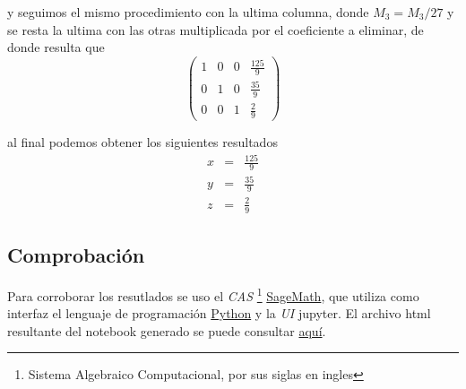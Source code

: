 \documentclass[11pt]{article}
\begin{document}
\begin{multicols}{2}
\begin{enumerate}[\bf{Sistema} 1]
			y seguimos el mismo procedimiento con la ultima columna, donde $M_3 = M_3/27$ y se resta la ultima con las otras multiplicada por el coeficiente a eliminar, de donde resulta que
			$$\left(\begin{array}{rrrr}
				1 & 0 & 0 & \frac{125}{9} \\
				0 & 1 & 0 & \frac{35}{9} \\
				0 & 0 & 1 & \frac{2}{9}
			\end{array}\right)$$ 
			
			al final podemos obtener los siguientes resultados
			\begin{eqnarray*}
				x &=& \frac{125}{9} \\
				y &=& \frac{ 35}{9} \\
				z &=& \frac{  2}{9}
			\end{eqnarray*}	

	\end{enumerate}
\end{multicols}




	\subsection*{Comprobaci\'on}
	\par Para corroborar los resutlados se uso el \textit{CAS} 
\footnote{Sistema Algebraico Computacional, por sus siglas en ingles} 
	\href{https://www.sagemath.org/}{SageMath}, que utiliza como interfaz el lenguaje de programaci\'on \href{https://www.python.org/}{Python} y la \textit{UI} jupyter. El archivo html resultante del notebook generado se puede consultar \href{https://github.com/BenchHPZ/UnADM-Biotecnologia/blob/master/B1-1/BALI/Actividades/BALI_U2_EA_BERC.ipynb}{aqu\'i}.
	
\end{document}
